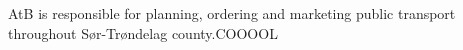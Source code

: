 AtB is responsible for planning, ordering and marketing public transport throughout Sør-Trøndelag county.COOOOL



